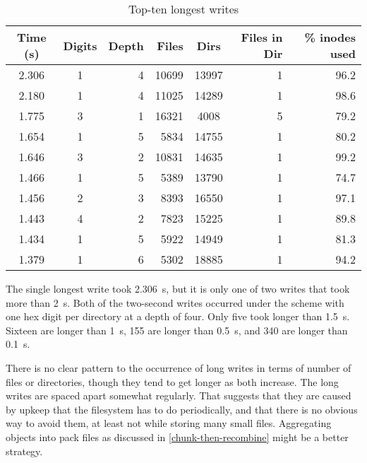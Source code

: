 \begin{table}
    \caption{Top-ten longest writes}
    \label{longest-writes}
    \begin{tabular}{c c r r c r r}
        Time (\si{\s}) & Digits & Depth & Files & Dirs & Files in Dir & \% inodes used \\
        \midrule
2.306 & 1 & 4 & 10699 & 13997 &  1 & 96.2 \\
2.180 & 1 & 4 & 11025 & 14289 &  1 & 98.6 \\
1.775 & 3 & 1 & 16321 &  4008 &  5 & 79.2 \\
1.654 & 1 & 5 &  5834 & 14755 &  1 & 80.2 \\
1.646 & 3 & 2 & 10831 & 14635 &  1 & 99.2 \\
1.466 & 1 & 5 &  5389 & 13790 &  1 & 74.7 \\
1.456 & 2 & 3 &  8393 & 16550 &  1 & 97.1 \\
1.443 & 4 & 2 &  7823 & 15225 &  1 & 89.8 \\
1.434 & 1 & 5 &  5922 & 14949 &  1 & 81.3 \\
1.379 & 1 & 6 &  5302 & 18885 &  1 & 94.2 \\
    \end{tabular}
\end{table}

The single longest write took \SI{2.306}{\s}, but it is only one of two writes
that took more than \SI{2}{\s}. Both of the two-second writes occurred under the
scheme with one hex digit per directory at a depth of four. Only five took
longer than \SI{1.5}{\s}. Sixteen are longer than \SI{1}{\s}, \num{155} are
longer than \SI{0.5}{\s}, and \num{340} are longer than \SI{0.1}{\s}.

There is no clear pattern to the occurrence of long writes in terms of number of
files or directories, though they tend to get longer as both increase. The long
writes are spaced apart somewhat regularly. That suggests that they are caused
by upkeep that the filesystem has to do periodically, and that there is no
obvious way to avoid them, at least not while storing many small files.
Aggregating objects into pack files as discussed in
\autoref{chunk-then-recombine} might be a better strategy.

